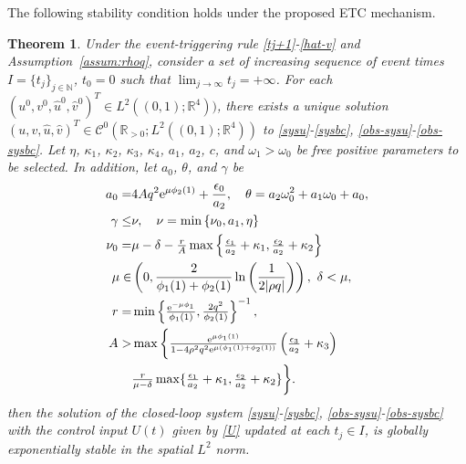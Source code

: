 \documentclass[letterpaper, 10 pt, conference]{ieeeconf}
\newtheorem{theorem}{Theorem}
\begin{document}
The following stability condition holds under the proposed ETC mechanism.
\begin{theorem}
    Under the event-triggering rule \eqref{tj+1}-\eqref{hat-v} and Assumption~\ref{assum:rhoq}, consider a set of increasing sequence of event times $I=\{t_j\}_{j\in\mathbb{N}}$, $t_0=0$ such that $\lim_{j\rightarrow\infty}t_j=+\infty$. For each $(u^0, v^0, \hat u^0, \hat v^0)^T\in L^2((0,1);\mathbb{R}^4))$, there exists a unique solution $(u, v, \hat u, \hat v)^T\in\mathcal{C}^0(\mathbb{R}_{>0};L^2((0,1);\mathbb{R}^4))$ to \eqref{sysu}-\eqref{sysbc}, \eqref{obs-sysu}-\eqref{obs-sysbc}. Let $\eta$, $\kappa_1$, $\kappa_2$, $\kappa_3$, $\kappa_4$, $a_1$, $a_2$, $c$, and $\omega_1>\omega_0$ be free positive parameters to be selected. In addition, let $a_0$, $\theta$, and $\gamma$ be
\begin{align}
    a_0 =& 4Aq^2\mathrm{e}^{\mu\phi_2(1)} + \frac{\epsilon_0}{a_2},\quad \theta = a_2\omega_0^2 + a_1\omega_0 + a_0,\label{a0-theta}\\
    \gamma\leq&\nu,\quad \nu=\min\left\{\nu_0,a_1,\eta\right\}\label{gamma-nu}\\
    \nu_0 =& \mu-\delta-\tfrac{r}{A}\max\left\{\tfrac{\epsilon_1}{a_2} + \kappa_1,\tfrac{\epsilon_2}{a_2} + \kappa_2\right\}\label{nu0}\\
    \mu\in&\left(0,\frac{2}{\phi_1(1) + \phi_2(1)}\ln\left(\frac{1}{2|\rho q|}\right)\right),~\delta<\mu,\label{mu}\\
    r=&\min\left\{\tfrac{\mathrm{e}^{-\mu\phi_1}}{\phi_1(1)},\tfrac{2q^2}{\phi_2(1)}\right\}^{-1},\label{r}\\
    A >& \max\bigg\{\tfrac{\mathrm{e}^{\mu\phi_1(1)}}{1-4\rho^2q^2\mathrm{e}^{\mu\left(\phi_1(1) + \phi_2(1)\right)}}\left(\tfrac{\epsilon_3}{a_2}+\kappa_3\right)\notag\\
    &\tfrac{r}{\mu-\delta}\max\{\tfrac{\epsilon_1}{a_2}+\kappa_1,\tfrac{\epsilon_2}{a_2}+\kappa_2\}\bigg\}.\label{A}
\end{align}
then the solution of the closed-loop system \eqref{sysu}-\eqref{sysbc}, \eqref{obs-sysu}-\eqref{obs-sysbc} with the control input $U(t)$ given by \eqref{U} updated at each $t_j\in I$, is globally exponentially stable in the spatial $L^2$ norm.
\end{theorem}
\end{document}
